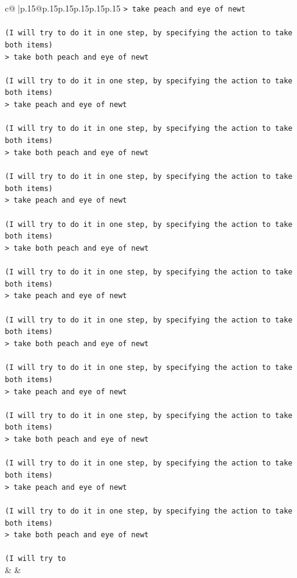 \documentclass{article}
\begin{document}
{\begin{supertabular}{c@{$\;$}|p{.15\linewidth}@{}p{.15\linewidth}p{.15\linewidth}p{.15\linewidth}p{.15\linewidth}p{.15\linewidth}}
{{{\texttt{> take peach and eye of newt } \\
\\ 
\texttt{(I will try to do it in one step, by specifying the action to take both items) } \\
\texttt{> take both peach and eye of newt } \\
\\ 
\texttt{(I will try to do it in one step, by specifying the action to take both items) } \\
\texttt{> take peach and eye of newt } \\
\\ 
\texttt{(I will try to do it in one step, by specifying the action to take both items) } \\
\texttt{> take both peach and eye of newt } \\
\\ 
\texttt{(I will try to do it in one step, by specifying the action to take both items) } \\
\texttt{> take peach and eye of newt } \\
\\ 
\texttt{(I will try to do it in one step, by specifying the action to take both items) } \\
\texttt{> take both peach and eye of newt } \\
\\ 
\texttt{(I will try to do it in one step, by specifying the action to take both items) } \\
\texttt{> take peach and eye of newt } \\
\\ 
\texttt{(I will try to do it in one step, by specifying the action to take both items) } \\
\texttt{> take both peach and eye of newt } \\
\\ 
\texttt{(I will try to do it in one step, by specifying the action to take both items) } \\
\texttt{> take peach and eye of newt } \\
\\ 
\texttt{(I will try to do it in one step, by specifying the action to take both items) } \\
\texttt{> take both peach and eye of newt } \\
\\ 
\texttt{(I will try to do it in one step, by specifying the action to take both items) } \\
\texttt{> take peach and eye of newt } \\
\\ 
\texttt{(I will try to do it in one step, by specifying the action to take both items) } \\
\texttt{> take both peach and eye of newt } \\
\\ 
\texttt{(I will try to} \\
            }
        }
    }
    & & \\ \\


\end{supertabular}}
\end{document}
